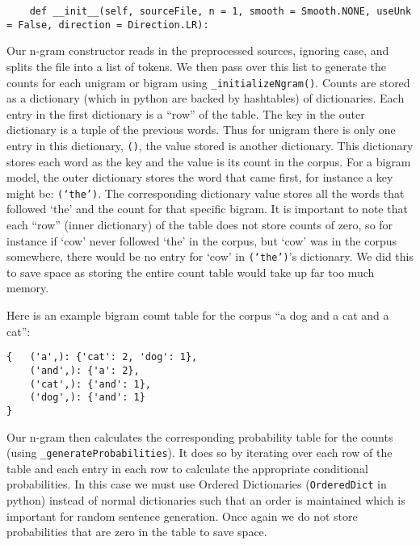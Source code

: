 \documentclass{article}
\begin{document}
{\small\begin{verbatim}
    def __init__(self, sourceFile, n = 1, smooth = Smooth.NONE, useUnk = False, direction = Direction.LR):
\end{verbatim}}

Our n-gram constructor reads in the preprocessed sources, ignoring case, and splits the file into a list of tokens. We then pass over this list to generate the counts for each unigram or bigram using \texttt{\_initializeNgram()}. Counts are stored as a dictionary (which in python are  backed by hashtables) of dictionaries. Each entry in the first dictionary is a ``row'' of the table. The key in the outer dictionary is a tuple of the previous words. Thus for unigram there is only one entry in this dictionary, \texttt{()}, the value stored is another dictionary. This dictionary stores each word as the key and the value is its count in the corpus. For a bigram model, the outer dictionary stores the word that came first, for instance a key might be: \texttt{(`the')}. The corresponding dictionary value stores all the words that followed `the' and the count for that specific bigram. It is important to note that each ``row'' (inner dictionary) of the table does not store counts of zero, so for instance if `cow' never followed `the' in the corpus, but `cow' was in the corpus somewhere, there would be no entry for `cow' in \texttt{(`the')}'s dictionary. We did this to save space as storing the entire count table would take up far too much memory.\par
Here is an example bigram count table for the corpus ``a dog and a cat and a cat'':
\begin{verbatim}
{   ('a',): {'cat': 2, 'dog': 1},
    ('and',): {'a': 2},
    ('cat',): {'and': 1},
    ('dog',): {'and': 1}
}
\end{verbatim}

Our n-gram then calculates the corresponding probability table for the counts (using \texttt{\_generateProbabilities}). It does so by iterating over each row of the table and each entry in each row to calculate the appropriate conditional probabilities. In this case we must use Ordered Dictionaries (\texttt{OrderedDict} in python) instead of normal dictionaries such that an order is maintained which is important for random sentence generation. Once again we do not store probabilities that are zero in the table to save space. 
\end{document}
